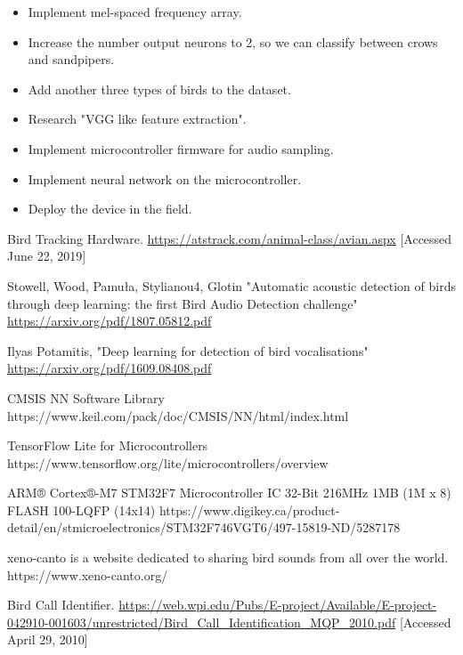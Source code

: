 \documentclass{article}
\begin{document}
\begin{itemize}
\item Implement mel-spaced frequency array.
\item Increase the number output neurons to 2, so we can classify between crows and sandpipers. 
\item Add another three types of birds to the dataset.
\item Research "VGG like feature extraction".
\item Implement microcontroller firmware for audio sampling.
\item Implement neural network on the microcontroller.
\item Deploy the device in the field.
\end{itemize}

\begin{thebibliography}{1}

Bird Tracking Hardware.
\url{https://atstrack.com/animal-class/avian.aspx} [Accessed June 22, 2019]

Stowell, Wood, Pamuła, Stylianou4, Glotin "Automatic acoustic detection of birds through deep learning: the first Bird Audio Detection challenge"
\url{https://arxiv.org/pdf/1807.05812.pdf}

Ilyas Potamitis, "Deep learning for detection of bird vocalisations"
\url{https://arxiv.org/pdf/1609.08408.pdf}

CMSIS NN Software Library
https://www.keil.com/pack/doc/CMSIS/NN/html/index.html

TensorFlow Lite for Microcontrollers
https://www.tensorflow.org/lite/microcontrollers/overview

ARM® Cortex®-M7 STM32F7 Microcontroller IC 32-Bit 216MHz 1MB (1M x 8) FLASH 100-LQFP (14x14)
https://www.digikey.ca/product-detail/en/stmicroelectronics/STM32F746VGT6/497-15819-ND/5287178

xeno-canto is a website dedicated to sharing bird sounds from all over the world.
https://www.xeno-canto.org/

Bird Call Identifier.
\url{https://web.wpi.edu/Pubs/E-project/Available/E-project-042910-001603/unrestricted/Bird_Call_Identification_MQP_2010.pdf} [Accessed April 29, 2010]

\end{thebibliography}
\end{document}
